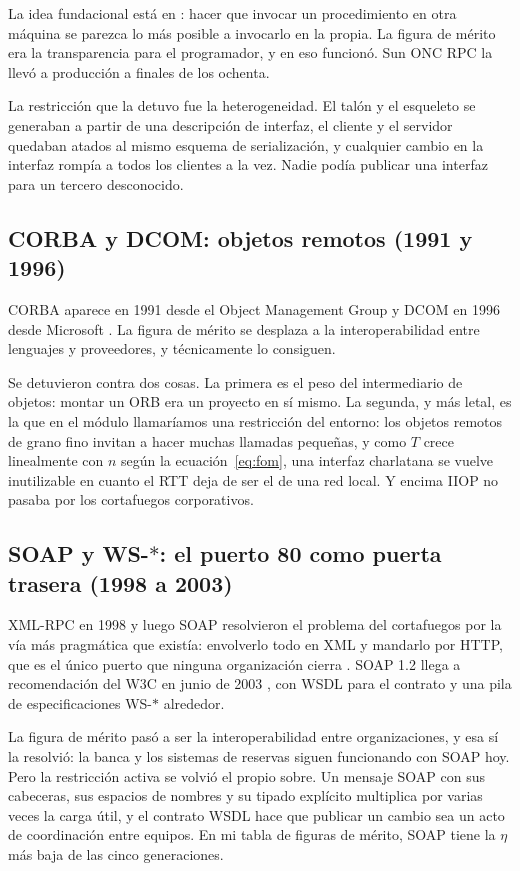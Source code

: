 \documentclass[11pt,letterpaper]{article}
\begin{document}
La idea fundacional está en \textcite{birrell1984}: hacer que invocar un
procedimiento en otra máquina se parezca lo más posible a invocarlo en la
propia. La figura de mérito era la transparencia para el programador, y en eso
funcionó. Sun ONC RPC la llevó a producción a finales de los ochenta.

La restricción que la detuvo fue la heterogeneidad. El talón y el esqueleto se
generaban a partir de una descripción de interfaz, el cliente y el servidor
quedaban atados al mismo esquema de serialización, y cualquier cambio en la
interfaz rompía a todos los clientes a la vez. Nadie podía publicar una interfaz
para un tercero desconocido.

\subsection*{CORBA y DCOM: objetos remotos (1991 y 1996)}

CORBA aparece en 1991 desde el Object Management Group y DCOM en 1996 desde
Microsoft \parencite{wikicorba}. La figura de mérito se desplaza a la
interoperabilidad entre lenguajes y proveedores, y técnicamente lo consiguen.

Se detuvieron contra dos cosas. La primera es el peso del intermediario de
objetos: montar un ORB era un proyecto en sí mismo. La segunda, y más letal,
es la que en el módulo llamaríamos una restricción del entorno: los objetos
remotos de grano fino invitan a hacer muchas llamadas pequeñas, y como
$T$ crece linealmente con $n$ según la ecuación~\eqref{eq:fom}, una interfaz
charlatana se vuelve inutilizable en cuanto el RTT deja de ser el de una red
local. Y encima IIOP no pasaba por los cortafuegos corporativos.

\subsection*{SOAP y WS-$\ast$: el puerto 80 como puerta trasera (1998 a 2003)}

XML-RPC en 1998 y luego SOAP resolvieron el problema del cortafuegos por la vía
más pragmática que existía: envolverlo todo en XML y mandarlo por HTTP, que es
el único puerto que ninguna organización cierra \parencite{wikixmlrpc}. SOAP 1.2
llega a recomendación del W3C en junio de 2003 \parencite{w3c2003soap}, con WSDL
para el contrato y una pila de especificaciones WS-$\ast$ alrededor.

La figura de mérito pasó a ser la interoperabilidad entre organizaciones, y esa
sí la resolvió: la banca y los sistemas de reservas siguen funcionando con
SOAP hoy. Pero la restricción activa se volvió el propio sobre. Un mensaje SOAP
con sus cabeceras, sus espacios de nombres y su tipado explícito multiplica por
varias veces la carga útil, y el contrato WSDL hace que publicar un cambio sea
un acto de coordinación entre equipos. En mi tabla de figuras de mérito, SOAP
tiene la $\eta$ más baja de las cinco generaciones.
\end{document}
